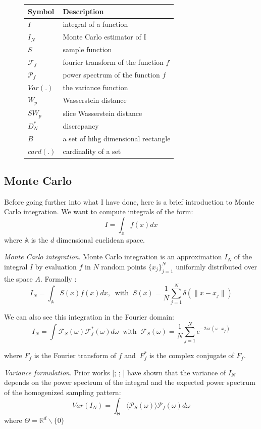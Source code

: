 \documentclass{classeENS}
\begin{document}
\begin{figure}[H]
    \centering
    \begin{tabular}{C{2cm} L{10cm}}
    \hline  
        Symbol & Description
    \tabularnewline 
    \hline
        $I$ & integral of a function
    \tabularnewline
        $I_N$ & Monte Carlo estimator of I
    \tabularnewline
        $S$ & sample function
    \tabularnewline
        $\mathcal F_f$ & fourier transform of the function $f$
    \tabularnewline
        $\mathcal P_f$ & power spectrum of the function $f$
    \tabularnewline
        $Var(.)$ & the variance function
    \tabularnewline
        $W_p$ & Wasserstein distance
    \tabularnewline
        $SW_p$ & slice Wasserstein distance
    \tabularnewline
        $D_N^*$ & discrepancy
    \tabularnewline
        $B$ & a set of hihg dimensional rectangle
    \tabularnewline
        $card(.)$ & cardinality of a set
    \tabularnewline
    \hline 
    \end{tabular}
\end{figure}

\subsection{Monte Carlo}

Before going further into what I have done, here is a brief 
introduction to Monte Carlo integration. We want to compute integrals of 
the form:
    \[ I = \int_{\mathbb A} f(x) dx\]
where $\mathbb A$ is the $d$ dimensional euclidean space.

\> \textit{Monte Carlo integration}. Monte Carlo integration is an approximation
    $I_N$ of the integral $I$ by evaluation $f$ in $N$ random points $\{x_j\}_{j=1}^N$ uniformly 
    distributed over the space $A$. Formally :
    \[ I_N = \int_{\mathbb A} S(x)f(x)dx, 
        \: \text{ with } \:
    S(x) = \frac{1}{N} \sum_{j=1}^N \delta(\lVert x-x_j \rVert) \] 

\noindent We can also see this integration in the Fourier domain:
\[I_N = \int \mathcal F_S(\omega) \mathcal F_f^*(\omega) d\omega 
    \: \text{ with } \:
    \mathcal F_S(\omega) = \frac{1}{N} \sum_{j=1}^N e^{-2i\pi(\omega\cdot x_j)} \]

    \noindent where $F_f$ is the Fourier transform of $f$ and $\ F_f^*$ is the 
    complex conjugate of $F_f$.

\> \textit{Variance formulation}. Prior works [\cite{Durand2011AFA}; \cite{Pilleboue:2015:VAMCI}; \cite{10.1145/2461912.2462013}] 
    have shown that the variance of $I_N$ depends on the power spectrum of the integral 
    and the expected power spectrum of the homogenized sampling pattern:
    \[ Var(I_N) = \int_\Theta \langle \mathcal P_S(\omega)\rangle \mathcal P_f(\omega) d\omega \]
    \noindent where $\Theta = \mathbb R^d\backslash\{0\} $
\end{document}
